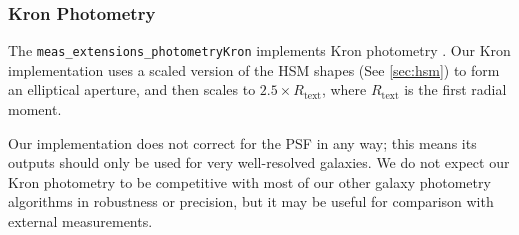 \subsubsection{Kron Photometry}
\label{sec:kron}

The \texttt{meas\_extensions\_photometryKron} implements Kron photometry \citep{1980ApJS...43..305K}.
Our Kron implementation uses a scaled version of the HSM shapes (See \ref{sec:hsm}) to form an elliptical aperture, and then scales to $2.5 \times R_{\mathrm{text}}$, where $R_{\mathrm{text}}$ is the first radial moment.

Our implementation does not correct for the PSF in any way; this means its outputs should only be used for very well-resolved galaxies.
We do not expect our Kron photometry to be competitive with most of our other galaxy photometry algorithms in robustness or precision, but it may be useful for comparison with external measurements.
